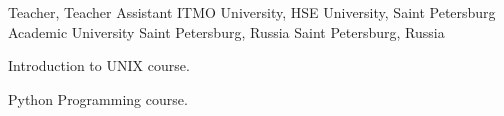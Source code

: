 

\begin{cventries}

  \cventry
    {Teacher, Teacher Assistant} %
    {ITMO University, HSE University, Saint Petersburg Academic University} %
    {Saint Petersburg, Russia} %
    {Saint Petersburg, Russia} %
    {
      \begin{cvitems} %
        \item {Introduction to UNIX course.}
        \item {Python Programming course.}
      \end{cvitems}
    }

\end{cventries}

